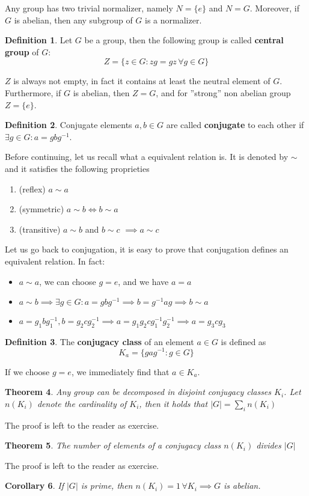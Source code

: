 \documentclass[12pt]{book}
\theoremstyle{plain}
\newtheorem{thm}{Theorem}[section]
\newtheorem{coro}[thm]{Corollary}
\theoremstyle{definition}
\newtheorem{dfn}[thm]{Definition}
\theoremstyle{remark}
\begin{document}
Any group has two trivial normalizer, namely $N=\{e\}$ and $N=G$. Moreover, if $G$ is abelian, then any subgroup of $G$ is a normalizer.
\begin{dfn}
Let $G$ be a group, then the following group is called \textbf{central group} of $G$:
\[Z = \{z\in G:zg=gz\, \forall g\in G\}\]
\end{dfn}
$Z$ is always not empty, in fact it contains at least the neutral element of $G$. Furthermore, if $G$ is abelian, then $Z=G$, and for ''strong'' non abelian group $Z=\{e\}$.
\begin{dfn}
Conjugate elements $a,b\in G$ are called \textbf{conjugate} to each other if $\exists g\in G:a=gbg^{-1}$.
\end{dfn}
Before continuing, let us recall what a equivalent relation is. It is denoted by $\sim$ and it satisfies the following proprieties
\begin{enumerate}
	\item (reflex) $a \sim a$
	\item (symmetric) $a\sim b \iff b\sim a$
	\item (transitive) $a\sim b$ and $b\sim c$ $\implies a\sim c$
\end{enumerate}
Let us go back to conjugation, it is easy to prove that conjugation defines an equivalent relation. In fact:
\begin{itemize}
\item $a\sim a$, we can choose $g=e$, and we have $a=a$
\item $a\sim b \implies \exists g\in G: a=gbg^{-1} \implies b = g^{-1}ag \implies b\sim a$
\item $a=g_1bg^{-1}_1,b=g_2cg_2^{-1}\implies a = g_1g_2cg_1^{-1}g_2^{-1}\implies a = g_3cg_3$
\end{itemize}
\begin{dfn}
The \textbf{conjugacy class} of an element $a\in G$ is defined as
\[K_a = \{gag^{-1}:g\in G\}\]
\end{dfn} 
If we choose $g=e$, we immediately find that $a\in K_a$.
\begin{thm}
Any group can be decomposed in disjoint conjugacy classes $K_i$. Let $n(K_i)$ denote the cardinality of $K_i$, then it holds that $|G| = \sum_i n(K_i)$
\end{thm}
The proof is left to the reader as exercise.
\begin{thm}
The number of elements of a conjugacy class $n(K_i)$ divides $|G|$
\end{thm} 
The proof is left to the reader as exercise.
\begin{coro}
If $|G|$ is prime, then $n(K_i)=1\, \forall K_i \implies G$ is abelian.
\end{coro}
\end{document}
